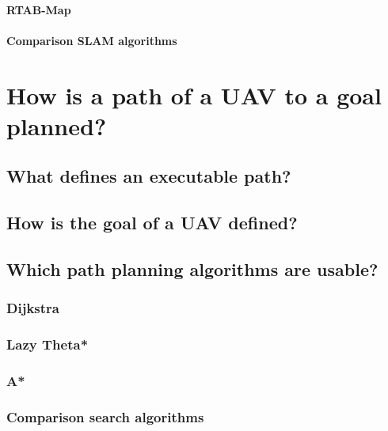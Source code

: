\documentclass[12pt, a4paper]{report}
\begin{document}
          \paragraph{RTAB\hyp{}Map}
          
          \paragraph{Comparison SLAM algorithms}
          
    \section{How is a path of a UAV to a goal planned?}
    
      \subsection{What defines an executable path?}
      
      \subsection{How is the goal of a UAV defined?}
      
      \subsection{Which path planning algorithms are usable?}
      
        \subsubsection{Dijkstra}
        
        \subsubsection{Lazy Theta*}
        
        \subsubsection{A*}
        
        \subsubsection{Comparison search algorithms}
        
\end{document}
